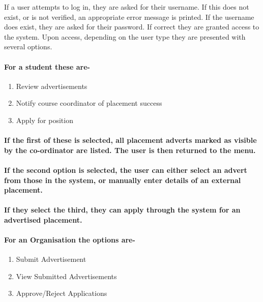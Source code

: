 \documentclass{article}
\begin{document}
If a user attempts to log in, they are asked for their username. If
this does not exist, or is not verified, an appropriate error message
is printed. If the username does exist, they are asked for their password.
If correct they are granted access to the system. Upon access, depending
on the user type they are presented with several options.


\paragraph{\textmd{For a student these are-}}
\begin{enumerate}
\item Review advertisements
\item Notify course coordinator of placement success 
\item Apply for position
\end{enumerate}

\paragraph*{\textmd{If the first of these is selected, all placement adverts
marked as visible by the co-ordinator are listed. The user is then
returned to the menu.}}


\paragraph*{\textmd{If the second option is selected, the user can either select
an advert from those in the system, or manually enter details of an
external placement.}}


\paragraph*{\textmd{If they select the third, they can apply through the system
for an advertised placement.}}


\paragraph*{\textmd{For an Organisation the options are-}}
\begin{enumerate}
\item Submit Advertisement
\item View Submitted Advertisements
\item Approve/Reject Applications
\end{enumerate}
\end{document}
